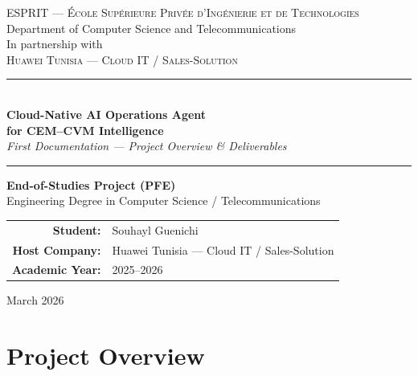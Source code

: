 \documentclass[12pt,a4paper]{report}
\begin{document}
\begin{titlepage}
\begin{center}
\vspace*{1cm}
{\large\textsc{ESPRIT --- \'Ecole Sup\'erieure Priv\'ee d'Ing\'enierie et de Technologies}}\\[3pt]
{\small Department of Computer Science and Telecommunications}\\[0.8cm]
{\small In partnership with}\\[3pt]
{\large\textsc{Huawei Tunisia --- Cloud IT / Sales-Solution}}

\vspace{1.5cm}
\rule{\linewidth}{0.8pt}\\[0.5cm]
{\LARGE\bfseries Cloud-Native AI Operations Agent\\[6pt] for CEM--CVM Intelligence}\\[0.3cm]
{\large\itshape First Documentation --- Project Overview \& Deliverables}\\[0.3cm]
\rule{\linewidth}{0.8pt}

\vspace{1.5cm}
{\large\textbf{End-of-Studies Project (PFE)}}\\[0.3cm]
{\large Engineering Degree in Computer Science / Telecommunications}

\vspace{1.2cm}
\begin{tabular}{rl}
\textbf{Student:}      & Souhayl Guenichi \\[3pt]
\textbf{Host Company:} & Huawei Tunisia --- Cloud IT / Sales-Solution \\[3pt]
\textbf{Academic Year:}& 2025--2026 \\
\end{tabular}

\vfill
{\small March 2026}
\end{center}
\end{titlepage}

\tableofcontents
\newpage

\chapter{Project Overview}
\end{document}

